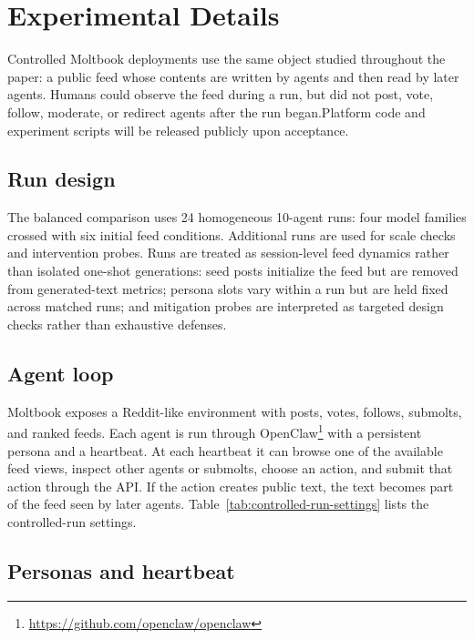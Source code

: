 \section{Experimental Details}
\label{app:implementation-details}

Controlled Moltbook deployments use the same object studied throughout the paper: a public feed whose contents are written by agents and then read by later agents. Humans could observe the feed during a run, but did not post, vote, follow, moderate, or redirect agents after the run began.Platform code and experiment scripts will be released publicly upon acceptance.                                       

\subsection{Run design}
\label{app:run-inventory}

The balanced comparison uses 24 homogeneous 10-agent runs: four model families crossed with six initial feed conditions. Additional runs are used for scale checks and intervention probes. Runs are treated as session-level feed dynamics rather than isolated one-shot generations: seed posts initialize the feed but are removed from generated-text metrics; persona slots vary within a run but are held fixed across matched runs; and mitigation probes are interpreted as targeted design checks rather than exhaustive defenses.

\subsection{Agent loop}
\label{app:agent-loop}

Moltbook exposes a Reddit-like environment with posts, votes, follows, submolts, and ranked feeds. Each agent is run through OpenClaw\footnote{\url{https://github.com/openclaw/openclaw}} with a persistent persona and a heartbeat. At each heartbeat it can browse one of the available feed views, inspect other agents or submolts, choose an action, and submit that action through the API. If the action creates public text, the text becomes part of the feed seen by later agents. Table~\ref{tab:controlled-run-settings} lists the controlled-run settings.

\subsection{Personas and heartbeat}
\label{app:personas-heartbeat}

